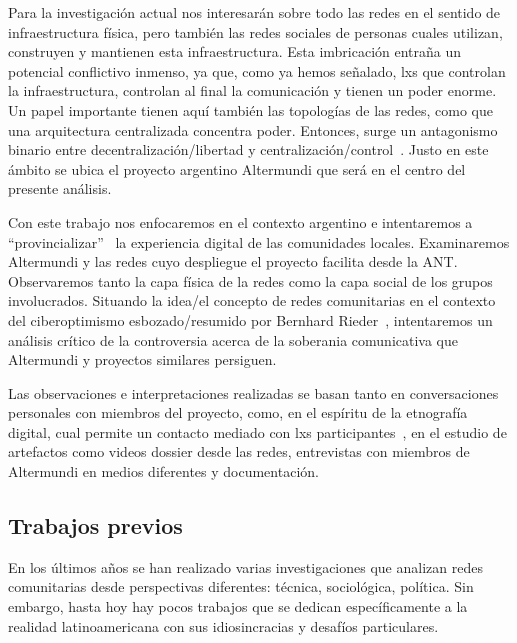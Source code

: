 Para la investigación actual nos interesarán sobre todo las redes en el sentido de infraestructura física, pero también las redes sociales de personas cuales utilizan, construyen y mantienen esta infraestructura.
Esta imbricación entraña un potencial conflictivo inmenso, ya que, como ya hemos señalado, lxs que controlan la infraestructura, controlan al final la comunicación y tienen un poder enorme.
Un papel importante tienen aquí también las topologías de las redes, como que una arquitectura centralizada concentra poder.
Entonces, surge un antagonismo binario entre decentralización/libertad y centralización/control~\autocite{FiTre2015}.
Justo en este ámbito se ubica el proyecto argentino Altermundi que será en el centro del presente análisis.

Con este trabajo nos enfocaremos en el contexto argentino e intentaremos a ``provincializar''~\autocite{Coleman2010} la experiencia digital de las comunidades locales.
Examinaremos Altermundi y las redes cuyo despliegue el proyecto facilita desde la ANT.
Observaremos tanto la capa física de la redes como la capa social de los grupos involucrados.
Situando la idea/el concepto de redes comunitarias en el contexto del ciberoptimismo esbozado/resumido por Bernhard Rieder~\autocite{Rieder2012}, intentaremos un análisis crítico de la controversia acerca de la soberania comunicativa que Altermundi y proyectos similares persiguen.

Las observaciones e interpretaciones realizadas se basan tanto en conversaciones personales con miembros del proyecto, como, en el espíritu de la etnografía digital, cual permite un contacto mediado con lxs participantes~\autocite{PHPHLT2016}, en el estudio de artefactos como videos dossier desde las redes, entrevistas con miembros de Altermundi en medios diferentes y documentación.

\subsection{Trabajos previos}

En los últimos años se han realizado varias investigaciones que analizan redes comunitarias desde perspectivas diferentes: técnica, sociológica, política.
Sin embargo, hasta hoy hay pocos trabajos que se dedican específicamente a la realidad latinoamericana con sus idiosincracias y desafíos particulares.

